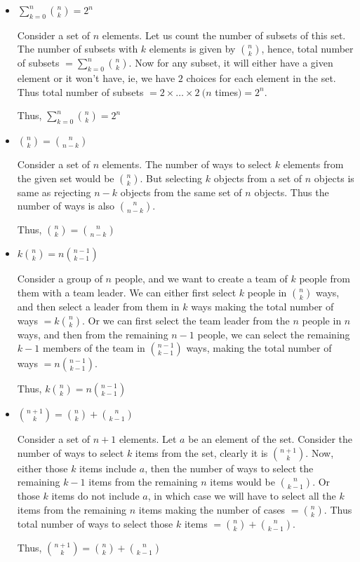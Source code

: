 \documentclass[14pt]{extarticle}
\begin{document}
\begin{itemize}
    \item $\sum_{k=0}^n \binom{n}{k} = 2^n$

    Consider a set of $n$ elements. Let us count the number of subsets of this set. The number of subsets with $k$ elements is given by $\binom{n}{k}$, hence, total number of subsets $= \sum_{k=0}^n \binom{n}{k}$. Now for any subset, it will either have a given element or it won't have, ie, we have $2$ choices for each element in the set. Thus total number of subsets $= 2 \times \dots \times 2 \ (n$ times$) = 2^n$.

    Thus, $\sum_{k=0}^n \binom{n}{k} = 2^n$

    \item  $\binom{n}{k} = \binom{n}{n-k}$

    Consider a set of $n$ elements. The number of ways to select $k$ elements from the given set would be $\binom{n}{k}$. But selecting $k$ objects from a set of $n$ objects is same as rejecting $n-k$ objects from the same set of $n$ objects. Thus the number of ways is also $\binom{n}{n-k}$.

    Thus, $\binom{n}{k} = \binom{n}{n-k}$

    \item $k\binom{n}{k} = n\binom{n-1}{k-1}$

    Consider a group of $n$ people, and we want to create a team of $k$ people from them with a team leader. We can either first select $k$ people in $\binom{n}{k}$ ways, and then select a leader from them in $k$ ways making the total number of ways $= k\binom{n}{k}$. Or we can first select the team leader from the $n$ people in $n$ ways, and then from the remaining $n-1$ people, we can select the remaining $k-1$ members of the team in $\binom{n-1}{k-1}$ ways, making the total number of ways $= n\binom{n-1}{k-1}$.

    Thus, $k\binom{n}{k} = n\binom{n-1}{k-1}$

    \item $\binom{n+1}{k} = \binom{n}{k} + \binom{n}{k-1}$

    Consider a set of $n+1$ elements. Let $a$ be an element of the set. Consider the number of ways to select $k$ items from the set, clearly it is $\binom{n+1}{k}$. Now, either those $k$ items include $a$, then the number of ways to select the remaining $k-1$ items from the remaining $n$ items would be $\binom{n}{k-1}$. Or those $k$ items do not include $a$, in which case we will have to select all the $k$ items from the remaining $n$ items making the number of cases $= \binom{n}{k}$. Thus total number of ways to select those $k$ items $= \binom{n}{k} + \binom{n}{k-1}$.

    Thus, $\binom{n+1}{k} = \binom{n}{k} + \binom{n}{k-1}$
\end{itemize}
\end{document}
